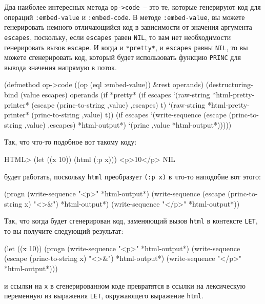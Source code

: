 Два наиболее интересных метода \lstinline{op->code}~-- это те, которые генерируют код для
операций \lstinline{:embed-value} и \lstinline{:embed-code}.  В методе \lstinline{:embed-value}, вы
можете генерировать немного отличающийся код в зависимости от значения аргумента
\lstinline{escapes}, поскольку, если \lstinline{escapes} равен \lstinline{NIL}, то вам нет необходимости
генерировать вызов \lstinline{escape}.  И когда и \lstinline{*pretty*}, и \lstinline{escapes} равны
\lstinline{NIL}, то вы можете сгенерировать код, который будет использовать функцию
\lstinline{PRINC} для вывода значения напрямую в поток.

\begin{myverb}
(defmethod op->code ((op (eql :embed-value)) &rest operands)
  (destructuring-bind (value escapes) operands
    (if *pretty*
      (if escapes
        `(raw-string *html-pretty-printer* (escape (princ-to-string ,value) ,escapes) t)
        `(raw-string *html-pretty-printer* (princ-to-string ,value) t))
      (if escapes
        `(write-sequence (escape (princ-to-string ,value) ,escapes) *html-output*)
        `(princ ,value *html-output*)))))
\end{myverb}

Так, что что-то подобное вот такому коду:

\begin{myverb}
HTML> (let ((x 10)) (html (:p x)))
<p>10</p>
NIL
\end{myverb}

будет работать, поскольку \lstinline{html} преобразует \lstinline{(:p x)} в что-то наподобие вот
этого:

\begin{myverb}
(progn
  (write-sequence "<p>" *html-output*)
  (write-sequence (escape (princ-to-string x) "<>&") *html-output*)
  (write-sequence "</p>" *html-output*))
\end{myverb}

Так, что когда будет сгенерирован код, заменяющий вызов \lstinline{html} в контексте
\lstinline{LET}, то вы получите следующий результат:

\begin{myverb}
(let ((x 10))
  (progn
    (write-sequence "<p>" *html-output*)
    (write-sequence (escape (princ-to-string x) "<>&") *html-output*)
    (write-sequence "</p>" *html-output*)))
\end{myverb}

и ссылки на \lstinline{x} в сгенерированном коде превратятся в ссылки на лексическую переменную
из выражения \lstinline{LET}, окружающего выражение \lstinline{html}.

